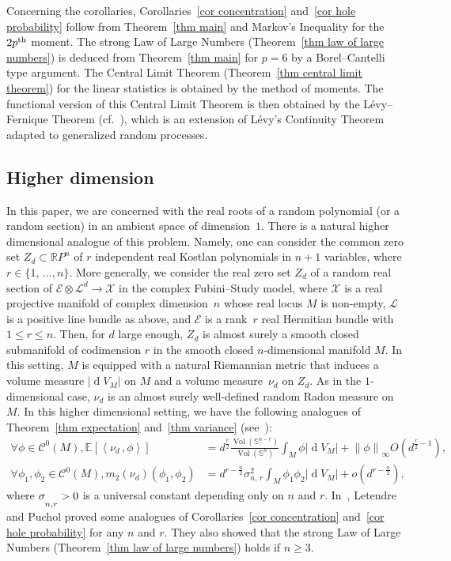 \documentclass[AHL,Unicode,longabstracts,published]{cedram}
\DeclareMathOperator{\dmesure}{d}
\DeclareMathOperator{\Vol}{Vol}
\newcommand{\E}{\mathcal{E}}
\newcommand{\X}{\mathcal{X}}
\renewcommand{\L}{\mathcal{L}}
\newcommand{\clC}{\mathcal{C}}
\newcommand{\R}{\mathbb{R}}
\renewcommand{\S}{\mathbb{S}}
\newcommand{\esp}[2][]{\mathbb{E}_{#1}\!\left[#2 \right]}
\newcommand{\norm}[1]{\left\lvert #1 \right\rvert}
\newcommand{\Norm}[1]{\left\lVert #1 \right\rVert}
\newcommand{\prsc}[2]{\left\langle #1\,, #2 \right\rangle}
\newcommand{\rmes}[1]{\norm{\dmesure\! V_{#1}}}
\newcommand{\vol}[1]{\Vol\!\left(#1\right)}
\renewcommand{\geq}{\geqslant}
\renewcommand{\leq}{\leqslant}
\let\oldforall\forall
\renewcommand*{\forall}{\mathrel{\oldforall}}
\begin{document}
Concerning the corollaries, Corollaries~\ref{cor concentration} and~\ref{cor hole probability} follow from Theorem~\ref{thm main} and Markov's Inequality for the $2p^{\rm th}$ moment. The strong Law of Large Numbers (Theorem~\ref{thm law of large numbers}) is deduced from Theorem~\ref{thm main} for $p=6$ by a Borel--Cantelli type argument. The Central Limit Theorem (Theorem~\ref{thm central limit theorem}) for the linear statistics is obtained by the method of moments. The functional version of this Central Limit Theorem is then obtained by the Lévy--Fernique Theorem (cf.~\cite{Fer1967}), which is an extension of Lévy's Continuity Theorem adapted to generalized random processes.


\subsection*{Higher dimension}

In this paper, we are concerned with the real roots of a random polynomial (or a random section) in an ambient space of dimension~$1$. There is a natural higher dimensional analogue of this problem. Namely, one can consider the common zero set $Z_d \subset \R P^n$ of $r$ independent real Kostlan polynomials in $n+1$ variables, where $r \in \{1,\,\dots,n\}$. More generally, we consider the real zero set $Z_d$ of a random real section of $\E \otimes \L^d \to \X$ in the complex Fubini--Study model, where $\X$ is a real projective manifold of complex dimension~$n$ whose real locus $M$ is non-empty, $\L$ is a positive line bundle as above, and $\E$ is a rank~$r$ real Hermitian bundle with $1 \leq r \leq n$. Then, for $d$ large enough, $Z_d$ is almost surely a smooth closed submanifold of codimension $r$ in the smooth closed $n$-dimensional manifold $M$. In this setting, $M$ is equipped with a natural Riemannian metric that induces a volume measure $\rmes{M}$ on $M$ and a volume measure~$\nu_d$ on $Z_d$. As in the $1$-dimensional case, $\nu_d$ is an almost surely well-defined random Radon measure on $M$. In this higher dimensional setting, we have the following analogues of Theorem~\ref{thm expectation} and~\ref{thm variance} (see~\cite{Let2016,Let2019,LP2019}):
\begin{align*}
\forall \phi \in \clC^0(M),  \esp{\prsc{\nu_d}{\phi}} &= d^\frac{r}{2} \frac{\vol{\S^{n-r}}}{\vol{\S^n}} \int_{M}\phi \rmes{M} + \Norm{\phi}_\infty O\left(d^{\frac{r}{2}-1}\right),\\
\forall \phi_1,\phi_2 \in \clC^0(M),  m_2(\nu_d)(\phi_1,\phi_2) &= d^{r -\frac{n}{2}} \sigma_{n,\,r}^2 \int_M \phi_1\phi_2 \rmes{M} + o\left(d^{r-\frac{n}{2}}\right),
\end{align*}
where $\sigma_{n,\rule{0pt}{10pt}r}>0$ is a universal constant depending only on $n$ and $r$. In~\cite{LP2019}, Letendre and Puchol proved some analogues of Corollaries~\ref{cor concentration} and~\ref{cor hole probability} for any $n$ and $r$. They also showed that the strong Law of Large Numbers (Theorem~\ref{thm law of large numbers}) holds if $n \geq 3$.
\end{document}
